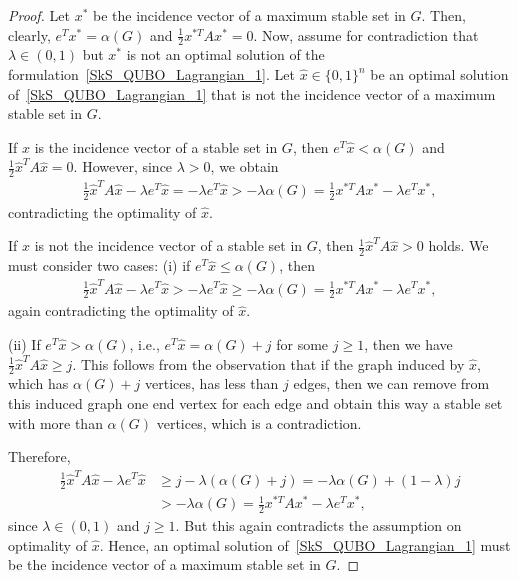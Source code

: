 \documentclass{article}
\begin{document}
\begin{proof}
Let $x^*$ be the incidence vector of a maximum stable set in $G$. Then, clearly, $e^T x^* = \alpha(G)$ and $\frac{1}{2} x^{*T} A x^* = 0$. Now, assume for contradiction that $\lambda \in (0,1)$ but $x^*$ is not an optimal solution of the formulation~\eqref{SkS_QUBO_Lagrangian_1}. Let $\hat{x} \in \{0,1\}^n$ be  an optimal solution of~\eqref{SkS_QUBO_Lagrangian_1} that is not the incidence vector of a maximum stable set in $G$. 

If $\hat{x}$ is the incidence vector of a stable set in $G$, then $e^T \hat{x} < \alpha(G)$ and $\frac{1}{2} \hat{x}^{T} A \hat{x} = 0$. However, since $\lambda > 0$, we obtain
\begin{align*}
\frac{1}{2} \hat{x}^T A \hat{x} - \lambda e^T \hat{x} = - \lambda e^T \hat{x} > - \lambda \alpha(G) = \frac{1}{2} x^{*T} A x^* - \lambda e^T x^*,
\end{align*}
contradicting the optimality of $\hat{x}$.

If $\hat{x}$ is not the incidence vector of a stable set in $G$, then $\frac{1}{2} \hat{x}^T A \hat{x} > 0$ holds. We must consider two cases:  (i) if $e^T \hat{x} \leq \alpha(G)$, then
\begin{align*}
\frac{1}{2} \hat{x}^T A \hat{x} - \lambda e^T \hat{x} >  -\lambda e^T \hat{x} \geq - \lambda \alpha(G) = \frac{1}{2} x^{*T} A x^* - \lambda e^T x^*,
\end{align*}
again contradicting the optimality of $\hat{x}$.

(ii) If $e^T \hat{x} > \alpha(G)$, i.e., $e^T \hat{x} = \alpha(G) + j$ for some $j \geq 1$, then
we have  $\frac{1}{2}\hat{x}^T A \hat{x} \geq j$.
This follows from the observation that if the graph induced by $\hat{x}$, which has $\alpha(G) + j$ vertices, has less than $j$ edges, then we can remove from this induced graph one end vertex for  each edge  and obtain this way a stable set with more than $\alpha(G)$ vertices, which is a contradiction.

Therefore, 
\begin{align*}
\frac{1}{2} \hat{x}^T A \hat{x} - \lambda e^T \hat{x} 
& \geq j - \lambda (\alpha(G) + j) = - \lambda \alpha(G) + (1 - \lambda) j\\
& > - \lambda \alpha(G) = \frac{1}{2} x^{*T} A x^* - \lambda e^T x^*,
\end{align*}
since $\lambda \in (0, 1)$ and $j \geq 1$. But this again contradicts the assumption on optimality of $\hat{x}$. Hence, an optimal solution of~\eqref{SkS_QUBO_Lagrangian_1} must be the incidence vector of a maximum stable set in $G$.
\end{proof}
\end{document}
